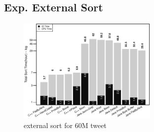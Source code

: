 \subsection{Exp. External Sort}
\begin{figure}
	\centering
	\includegraphics[width=\columnwidth,height=2in,keepaspectratio]{../../RScripts/Experiment_External_Sort_CPU_IO_Bar.pdf}
	\caption{external sort for 60M tweet}
	\label{fig:exp_memory}
\end{figure}